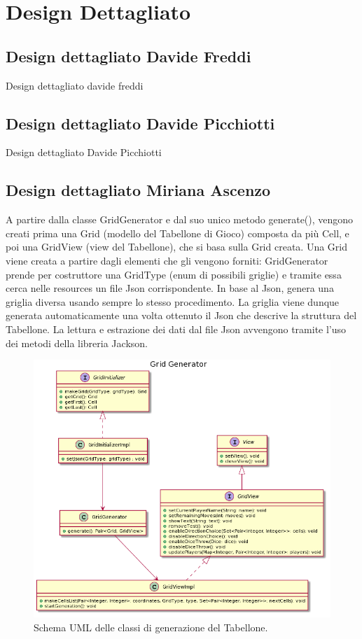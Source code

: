 \documentclass[a4paper,12pt]{report}
\begin{document}
\section{Design Dettagliato}

\subsection{Design dettagliato Davide Freddi}
Design dettagliato davide freddi

\subsection{Design dettagliato Davide Picchiotti}
Design dettagliato Davide Picchiotti

\subsection{Design dettagliato Miriana Ascenzo}

A partire dalla classe GridGenerator e dal suo unico metodo generate(), vengono creati prima una Grid (modello del Tabellone di Gioco) composta da più Cell, e poi una GridView (view del Tabellone), che si basa sulla Grid creata.
%
Una Grid viene creata a partire dagli elementi che gli vengono forniti: GridGenerator prende per costruttore una GridType (enum di possibili griglie) e tramite essa cerca nelle resources un file Json corrispondente.
%
In base al Json, genera una griglia diversa usando sempre lo stesso procedimento.
%
La griglia viene dunque generata automaticamente una volta ottenuto il Json che descrive la struttura del Tabellone.
%
La lettura e estrazione dei dati dal file Json avvengono tramite l’uso dei metodi della libreria Jackson.

\begin{figure}[!t]
\centering{}
\includegraphics[width=\textwidth]{images/miriana/grid_generator.png}
\caption{Schema UML delle classi di generazione del Tabellone.}
\label{img:gridfactorymethod}
\end{figure}
\end{document}
